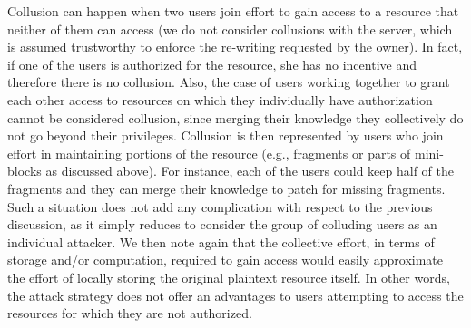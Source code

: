 \medskip
{}
Collusion can happen when two users join effort to gain access to a resource that neither of them can access (we do not consider collusions with the server, which is assumed trustworthy to enforce the re-writing requested by the owner). In fact, if one of the users is authorized for the resource, she has no incentive and therefore there is no collusion. Also, the case of users working together to grant each other access to resources on which they individually have authorization cannot be considered collusion, since merging their knowledge they collectively do not go beyond their privileges. Collusion is then represented by users who join effort in maintaining portions of the resource (e.g., fragments or parts of mini-blocks as discussed above). For instance, each of the users could keep half of the fragments and they can merge their knowledge to patch for missing fragments. Such a situation does not add any complication with respect to the previous discussion, as it simply reduces to consider the group of colluding users as an individual attacker. We then note again that the collective effort, in terms of storage and/or computation, required to gain access would easily approximate the effort of locally storing the original plaintext resource itself. In other words, the attack strategy does not offer an advantages to users attempting to access the resources for which they are not authorized.

